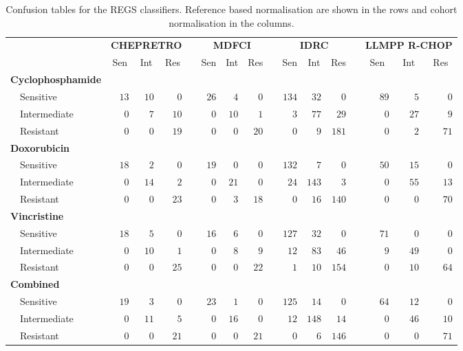 \begin{table}[!tbp]
{\small
\caption{Confusion tables for the REGS classifiers.
Reference based normalisation are shown in the rows and cohort normalisation in
the columns.\label{tab:confusiondrugreference}} 
\begin{center}
\begin{tabular}{lrrrcrrrcrrrcrrr}
\hline\hline
\multicolumn{1}{l}{\bfseries }&\multicolumn{3}{c}{\bfseries CHEPRETRO}&\multicolumn{1}{c}{\bfseries }&\multicolumn{3}{c}{\bfseries MDFCI}&\multicolumn{1}{c}{\bfseries }&\multicolumn{3}{c}{\bfseries IDRC}&\multicolumn{1}{c}{\bfseries }&\multicolumn{3}{c}{\bfseries LLMPP R-CHOP}\tabularnewline
\cline{2-4} \cline{6-8} \cline{10-12} \cline{14-16}
\multicolumn{1}{l}{}&\multicolumn{1}{c}{Sen}&\multicolumn{1}{c}{Int}&\multicolumn{1}{c}{Res}&\multicolumn{1}{c}{}&\multicolumn{1}{c}{Sen}&\multicolumn{1}{c}{Int}&\multicolumn{1}{c}{Res}&\multicolumn{1}{c}{}&\multicolumn{1}{c}{Sen}&\multicolumn{1}{c}{Int}&\multicolumn{1}{c}{Res}&\multicolumn{1}{c}{}&\multicolumn{1}{c}{Sen}&\multicolumn{1}{c}{Int}&\multicolumn{1}{c}{Res}\tabularnewline
\hline
{\bfseries Cyclophosphamide}&&&&&&&&&&&&&&&\tabularnewline
~~Sensitive&$13$&$10$&$ 0$&&$26$&$ 4$&$ 0$&&$134$&$ 32$&$  0$&&$89$&$ 5$&$ 0$\tabularnewline
~~Intermediate&$ 0$&$ 7$&$10$&&$ 0$&$10$&$ 1$&&$  3$&$ 77$&$ 29$&&$ 0$&$27$&$ 9$\tabularnewline
~~Resistant&$ 0$&$ 0$&$19$&&$ 0$&$ 0$&$20$&&$  0$&$  9$&$181$&&$ 0$&$ 2$&$71$\tabularnewline
\hline
{\bfseries Doxorubicin}&&&&&&&&&&&&&&&\tabularnewline
~~Sensitive&$18$&$ 2$&$ 0$&&$19$&$ 0$&$ 0$&&$132$&$  7$&$  0$&&$50$&$15$&$ 0$\tabularnewline
~~Intermediate&$ 0$&$14$&$ 2$&&$ 0$&$21$&$ 0$&&$ 24$&$143$&$  3$&&$ 0$&$55$&$13$\tabularnewline
~~Resistant&$ 0$&$ 0$&$23$&&$ 0$&$ 3$&$18$&&$  0$&$ 16$&$140$&&$ 0$&$ 0$&$70$\tabularnewline
\hline
{\bfseries Vincristine}&&&&&&&&&&&&&&&\tabularnewline
~~Sensitive&$18$&$ 5$&$ 0$&&$16$&$ 6$&$ 0$&&$127$&$ 32$&$  0$&&$71$&$ 0$&$ 0$\tabularnewline
~~Intermediate&$ 0$&$10$&$ 1$&&$ 0$&$ 8$&$ 9$&&$ 12$&$ 83$&$ 46$&&$ 9$&$49$&$ 0$\tabularnewline
~~Resistant&$ 0$&$ 0$&$25$&&$ 0$&$ 0$&$22$&&$  1$&$ 10$&$154$&&$ 0$&$10$&$64$\tabularnewline
\hline
{\bfseries Combined}&&&&&&&&&&&&&&&\tabularnewline
~~Sensitive&$19$&$ 3$&$ 0$&&$23$&$ 1$&$ 0$&&$125$&$ 14$&$  0$&&$64$&$12$&$ 0$\tabularnewline
~~Intermediate&$ 0$&$11$&$ 5$&&$ 0$&$16$&$ 0$&&$ 12$&$148$&$ 14$&&$ 0$&$46$&$10$\tabularnewline
~~Resistant&$ 0$&$ 0$&$21$&&$ 0$&$ 0$&$21$&&$  0$&$  6$&$146$&&$ 0$&$ 0$&$71$\tabularnewline
\hline
\end{tabular}\end{center}}

\end{table}
